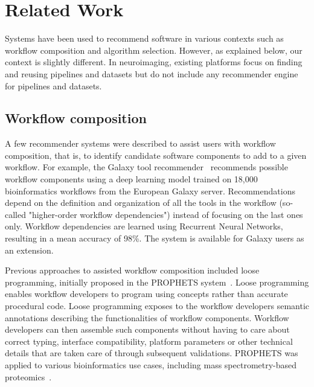 \documentclass[conference]{IEEEtran}
\begin{document}
\section{Related Work}
    
Systems have been used to recommend software in various contexts such as workflow composition and algorithm selection. However, as explained below, our context is slightly different. In neuroimaging, existing platforms focus on finding and reusing pipelines and datasets but do not include any recommender engine for pipelines and datasets.
    
\subsection{Workflow composition}

A few recommender systems were described to assist users with workflow composition, that is, to identify candidate software components to add to a given workflow. For example, the Galaxy tool recommender~\cite{kumar2021tool} recommends possible workflow components using a deep learning model trained on 18,000 bioinformatics workflows from the European Galaxy server. Recommendations depend on the definition and organization of all the tools in the workflow (so-called "higher-order workflow dependencies") instead of focusing on the last ones only. Workflow dependencies are learned using Recurrent Neural Networks, resulting in a mean accuracy of 98\%. The system is available for Galaxy users as an extension. 

Previous approaches to assisted workflow composition included loose programming, initially proposed in the PROPHETS system~\cite{lamprecht2010synthesis,naujokat2012loose,lamprecht2013user}. Loose programming enables workflow developers to program using concepts rather than accurate procedural code. Loose programming exposes to the workflow developers semantic annotations describing the functionalities of workflow components. Workflow developers can then assemble such components without having to care about correct typing, interface compatibility, platform parameters or other technical details that are taken care of through subsequent validations. PROPHETS was applied to various bioinformatics use cases, including mass spectrometry-based proteomics~\cite{palmblad2019automated}.

\end{document}
